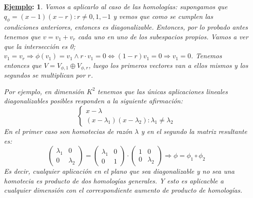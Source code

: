 \documentclass[10pt,a4paper,openright]{book}
\theoremstyle{break}
\newtheorem*{ej}{\underline{Ejemplo}:}
\begin{document}
\begin{ej}
Vamos a aplicarlo al caso de las homologías: supongamos que $q_\phi=(x-1)(x-r): r\neq 0,1,-1$ y vemos que como se cumplen las condiciones anteriores, entonces es diagonalizable. Entonces, por lo probado antes tenemos que $v=v_1+v_r$ cada uno en uno de los subespacios propios. Vamos a ver que la intersección es 0; $v_1=v_r\Rightarrow \phi(v_1)=v_1 \wedge r\cdot v_1=0\Leftrightarrow (1-r)v_1=0\Rightarrow v_1 = 0$. Tenemos entonces que $V=V_{\phi, 1} \oplus V_{\phi,r}$, luego los primeros vectores van a ellos mismos y los segundos se multiplican por $r$.

Por ejemplo, en dimensión $K^2$ tenemos que las únicas aplicaciones lineales diagonalizables posibles responden a la siguiente afirmación:
$$\begin{cases}x-\lambda \\ (x-\lambda_1)(x-\lambda_2): \lambda_1\neq \lambda_2 \end{cases}$$
En el primer caso son homotecias de razón $\lambda$ y en el segundo la matriz resultante es: 
$$\begin{pmatrix}
\lambda_1 & 0\\ 0&\lambda_2
\end{pmatrix}=\begin{pmatrix}
\lambda_1 & 0\\ 0&1
\end{pmatrix}\cdot\begin{pmatrix}
1 & 0\\ 0&\lambda_2
\end{pmatrix}\Rightarrow \phi=\phi_1\circ\phi_2$$
Es decir, cualquier aplicación en el plano que sea diagonalizable y no sea una homotecia es producto de dos homologías generales. Y esto es aplicacble a cualquier dimensión con el correspondiente aumento de producto de homologías.
\end{ej}
\end{document}
